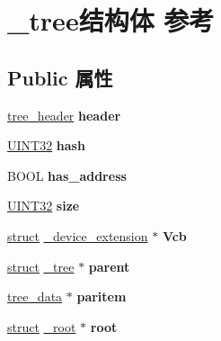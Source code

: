 \hypertarget{struct__tree}{}\section{\+\_\+tree结构体 参考}
\label{struct__tree}
\subsection*{Public 属性}
\begin{DoxyCompactItemize}
\item 
\mbox{\label{struct__tree_a08abbb6754ef9acf118f696b8be80756}} 
\hyperlink{structtree__header}{tree\+\_\+header} {\bfseries header}
\item 
\mbox{\label{struct__tree_a7f4e1b0de95a42188540d0f24118e75a}} 
\hyperlink{_processor_bind_8h_ae1e6edbbc26d6fbc71a90190d0266018}{U\+I\+N\+T32} {\bfseries hash}
\item 
\mbox{\label{struct__tree_aefa9d0c3252d28149037a479b79a6b0d}} 
B\+O\+OL {\bfseries has\+\_\+address}
\item 
\mbox{\label{struct__tree_ad9dd68cdc1c62d38d4a71d24f12d021a}} 
\hyperlink{_processor_bind_8h_ae1e6edbbc26d6fbc71a90190d0266018}{U\+I\+N\+T32} {\bfseries size}
\item 
\mbox{\label{struct__tree_aacc1f822ef28b62ebdaea2f72b170d0c}} 
\hyperlink{interfacestruct}{struct} \hyperlink{struct__device__extension}{\+\_\+device\+\_\+extension} $\ast$ {\bfseries Vcb}
\item 
\mbox{\label{struct__tree_adc3a84a293c5ae1ec01c855abcd0bebd}} 
\hyperlink{interfacestruct}{struct} \hyperlink{struct__tree}{\+\_\+tree} $\ast$ {\bfseries parent}
\item 
\mbox{\label{struct__tree_ad548ae733ed8b1325c1490bc4983591f}} 
\hyperlink{struct__tree__data}{tree\+\_\+data} $\ast$ {\bfseries paritem}
\item 
\mbox{\label{struct__tree_a29af11b2df79eeea4506e42ee5ba28c7}} 
\hyperlink{interfacestruct}{struct} \hyperlink{struct__root}{\+\_\+root} $\ast$ {\bfseries root}
\item 

\end{DoxyCompactItemize}
